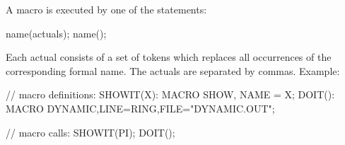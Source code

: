 A macro is executed by one of the statements:
\begin{example}
name(actuals);
name();
\end{example}
Each actual consists of a set of tokens which replaces all occurrences of
the corresponding formal name.
The actuals are separated by commas.
\noindent Example:
\begin{example}
// macro definitions:
SHOWIT(X): MACRO {
   SHOW, NAME = X;
}
DOIT(): MACRO {
   DYNAMIC,LINE=RING,FILE="DYNAMIC.OUT";
}

// macro calls:
SHOWIT(PI);
DOIT();
\end{example}



